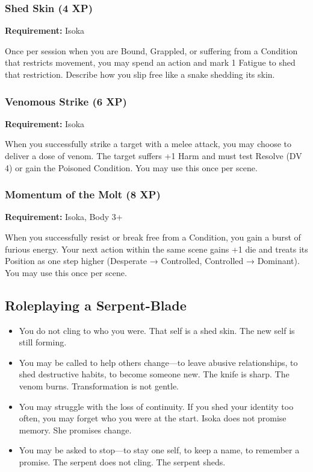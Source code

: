 \subsubsection{Shed Skin (4 XP)}

\textbf{Requirement:} Isoka

Once per session when you are Bound, Grappled, or suffering from a Condition that restricts movement, you may spend an action and mark 1 Fatigue to shed that restriction. Describe how you slip free like a snake shedding its skin.

\subsubsection{Venomous Strike (6 XP)}

\textbf{Requirement:} Isoka

When you successfully strike a target with a melee attack, you may choose to deliver a dose of venom. The target suffers +1 Harm and must test Resolve (DV 4) or gain the Poisoned Condition. You may use this once per scene.

\subsubsection{Momentum of the Molt (8 XP)}

\textbf{Requirement:} Isoka, Body 3+

When you successfully resist or break free from a Condition, you gain a burst of furious energy. Your next action within the same scene gains +1 die and treats its Position as one step higher (Desperate → Controlled, Controlled → Dominant). You may use this once per scene.

\subsection{Roleplaying a Serpent-Blade}

\begin{itemize}
\item You do not cling to who you were. That self is a shed skin. The new self is still forming.
\item You may be called to help others change—to leave abusive relationships, to shed destructive habits, to become someone new. The knife is sharp. The venom burns. Transformation is not gentle.
\item You may struggle with the loss of continuity. If you shed your identity too often, you may forget who you were at the start. Isoka does not promise memory. She promises change.
\item You may be asked to stop—to stay one self, to keep a name, to remember a promise. The serpent does not cling. The serpent sheds.
\end{itemize}


